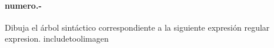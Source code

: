 

\paragraph{{numero}.-}\label{p{numero}}
Dibuja el árbol sintáctico correspondiente a la siguiente expresión regular {expresion}.
	{includetool}{{imagen}}

